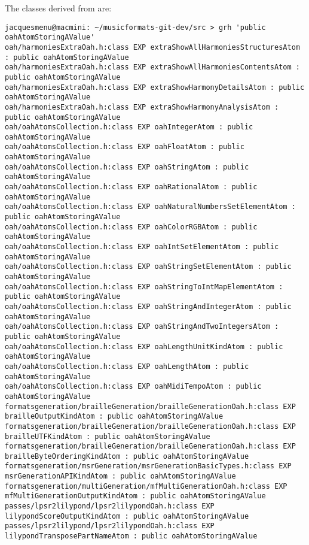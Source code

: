 The classes derived from  are:
\begin{lstlisting}[language=Terminal]
jacquesmenu@macmini: ~/musicformats-git-dev/src > grh 'public oahAtomStoringAValue'
oah/harmoniesExtraOah.h:class EXP extraShowAllHarmoniesStructuresAtom : public oahAtomStoringAValue
oah/harmoniesExtraOah.h:class EXP extraShowAllHarmoniesContentsAtom : public oahAtomStoringAValue
oah/harmoniesExtraOah.h:class EXP extraShowHarmonyDetailsAtom : public oahAtomStoringAValue
oah/harmoniesExtraOah.h:class EXP extraShowHarmonyAnalysisAtom : public oahAtomStoringAValue
oah/oahAtomsCollection.h:class EXP oahIntegerAtom : public oahAtomStoringAValue
oah/oahAtomsCollection.h:class EXP oahFloatAtom : public oahAtomStoringAValue
oah/oahAtomsCollection.h:class EXP oahStringAtom : public oahAtomStoringAValue
oah/oahAtomsCollection.h:class EXP oahRationalAtom : public oahAtomStoringAValue
oah/oahAtomsCollection.h:class EXP oahNaturalNumbersSetElementAtom : public oahAtomStoringAValue
oah/oahAtomsCollection.h:class EXP oahColorRGBAtom : public oahAtomStoringAValue
oah/oahAtomsCollection.h:class EXP oahIntSetElementAtom : public oahAtomStoringAValue
oah/oahAtomsCollection.h:class EXP oahStringSetElementAtom : public oahAtomStoringAValue
oah/oahAtomsCollection.h:class EXP oahStringToIntMapElementAtom : public oahAtomStoringAValue
oah/oahAtomsCollection.h:class EXP oahStringAndIntegerAtom : public oahAtomStoringAValue
oah/oahAtomsCollection.h:class EXP oahStringAndTwoIntegersAtom : public oahAtomStoringAValue
oah/oahAtomsCollection.h:class EXP oahLengthUnitKindAtom : public oahAtomStoringAValue
oah/oahAtomsCollection.h:class EXP oahLengthAtom : public oahAtomStoringAValue
oah/oahAtomsCollection.h:class EXP oahMidiTempoAtom : public oahAtomStoringAValue
formatsgeneration/brailleGeneration/brailleGenerationOah.h:class EXP brailleOutputKindAtom : public oahAtomStoringAValue
formatsgeneration/brailleGeneration/brailleGenerationOah.h:class EXP brailleUTFKindAtom : public oahAtomStoringAValue
formatsgeneration/brailleGeneration/brailleGenerationOah.h:class EXP brailleByteOrderingKindAtom : public oahAtomStoringAValue
formatsgeneration/msrGeneration/msrGenerationBasicTypes.h:class EXP msrGenerationAPIKindAtom : public oahAtomStoringAValue
formatsgeneration/multiGeneration/mfMultiGenerationOah.h:class EXP mfMultiGenerationOutputKindAtom : public oahAtomStoringAValue
passes/lpsr2lilypond/lpsr2lilypondOah.h:class EXP lilypondScoreOutputKindAtom : public oahAtomStoringAValue
passes/lpsr2lilypond/lpsr2lilypondOah.h:class EXP lilypondTransposePartNameAtom : public oahAtomStoringAValue

\end{lstlisting}
